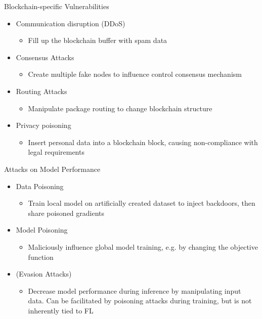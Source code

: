 \documentclass[t,aspectratio=169]{beamer}
\begin{document}
\begin{frame}{Blockchain-specific Vulnerabilities}
\vspace*{\fill}
    \begin{itemize}
        \item Communication disruption (DDoS)
        \begin{itemize}
            \item []Fill up the blockchain buffer with spam data
        \end{itemize}
        \item  Consensus Attacks
        \begin{itemize}
            \item []Create multiple fake nodes to influence control consensus mechanism
        \end{itemize}
        \item Routing Attacks
                \begin{itemize}
            \item[] Manipulate package routing to change blockchain structure
        \end{itemize}
        \item Privacy poisoning
        \begin{itemize}
            \item[] Insert personal data into a blockchain block, causing non-compliance with legal requirements
        \end{itemize}
    \end{itemize}
\vspace*{\fill}
\end{frame}
\begin{frame}{Attacks on Model Performance}
    \vspace*{\fill}
    \begin{itemize}
        \item Data Poisoning
        \begin{itemize}
            \item[] Train local model on artificially created dataset to inject backdoors, then share poisoned gradients
        \end{itemize}
        \item Model Poisoning
        \begin{itemize}
            \item[] Maliciously influence global model training, e.g. by changing the objective function
        \end{itemize}
        \item (Evasion Attacks)
        \begin{itemize}
            \item[] Decrease model performance during inference by manipulating input data. Can be facilitated by poisoning attacks during training, but is not inherently tied to FL
        \end{itemize}
    \end{itemize}
    \vspace*{\fill}
\end{frame}
\end{document}

